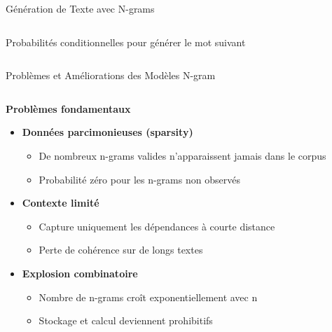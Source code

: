 \documentclass[aspectratio=169,11pt]{beamer}
\begin{document}
\begin{frame}{Génération de Texte avec N-grams}
\begin{columns}
\begin{column}{0.45\textwidth}
            \vspace{0.1cm}
            \begin{center}
                \small{Probabilités conditionnelles pour générer le mot suivant}
            \end{center}
        \end{column}
    \end{columns}
\end{frame}

\begin{frame}{Problèmes et Améliorations des Modèles N-gram}
    \begin{columns}
        \begin{column}{0.5\textwidth}
            \textbf{Problèmes fondamentaux}
            \begin{itemize}
                \item \textbf{Données parcimonieuses (sparsity)}
                \begin{itemize}
                    \item De nombreux n-grams valides n'apparaissent jamais dans le corpus
                    \item Probabilité zéro pour les n-grams non observés
                \end{itemize}
                \vspace{0.2cm}
                \item \textbf{Contexte limité}
                \begin{itemize}
                    \item Capture uniquement les dépendances à courte distance
                    \item Perte de cohérence sur de longs textes
                \end{itemize}
                \vspace{0.2cm}
                \item \textbf{Explosion combinatoire}
                \begin{itemize}
                    \item Nombre de n-grams croît exponentiellement avec n
                    \item Stockage et calcul deviennent prohibitifs
                \end{itemize}
            \end{itemize}
        \end{column}
        \begin{column}{0.5\textwidth}

\end{column}
\end{columns}
\end{frame}
\end{document}
